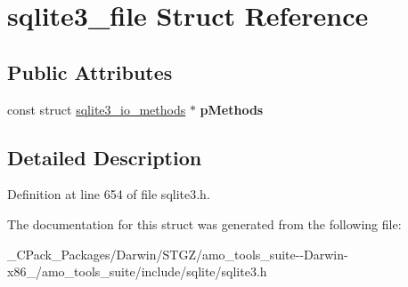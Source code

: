 \hypertarget{structsqlite3__file}{}\section{sqlite3\+\_\+file Struct Reference}
\label{structsqlite3__file}
\subsection*{Public Attributes}
\begin{DoxyCompactItemize}
\item 
\mbox{\label{structsqlite3__file_afbe27b40382393e63784a4d4b43f3ad7}} 
const struct \hyperlink{structsqlite3__io__methods}{sqlite3\+\_\+io\+\_\+methods} $\ast$ {\bfseries p\+Methods}
\end{DoxyCompactItemize}


\subsection{Detailed Description}


Definition at line 654 of file sqlite3.\+h.



The documentation for this struct was generated from the following file\+:\begin{DoxyCompactItemize}
\item 
\+\_\+\+C\+Pack\+\_\+\+Packages/\+Darwin/\+S\+T\+G\+Z/amo\+\_\+tools\+\_\+suite-\/-\/\+Darwin-\/x86\+\_/amo\+\_\+tools\+\_\+suite/include/sqlite/sqlite3.\+h\end{DoxyCompactItemize}
